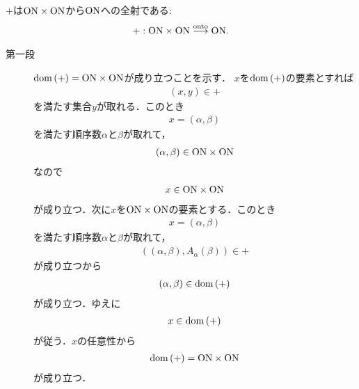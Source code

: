 	\begin{screen}
		\begin{thm}[$+$は$\ON$への全射である]\label{thm:summation_on_ordinal_numbers_is_a_mapping}
			$+$は$\mathrm{ON} \times \mathrm{ON}$から$\ON$への全射である:
			\begin{align}
				+:\mathrm{ON} \times \mathrm{ON} \overset{\mathrm{onto}}{\longrightarrow} \mathrm{ON}.
			\end{align}
		\end{thm}
	\end{screen}
	
	\begin{sketch}\mbox{}
		\begin{description}
			\item[第一段] $\operatorname*{dom} \left(+\right) = \mathrm{ON} \times \mathrm{ON}$が成り立つことを示す．
				$x$を$\operatorname*{dom} \left(+\right)$の要素とすれば
				\begin{align}
					(x,y) \in +
				\end{align}
				を満たす集合$y$が取れる．このとき
				\begin{align}
					x = (\alpha,\beta)
				\end{align}
				を満たす順序数$\alpha$と$\beta$が取れて，
				\begin{align}
					(\alpha, \beta) \in \mathrm{ON} \times \mathrm{ON}
				\end{align}
				なので
				\begin{align}
					x \in \mathrm{ON} \times \mathrm{ON}
				\end{align}
				が成り立つ．次に$x$を$\mathrm{ON} \times \mathrm{ON}$の要素とする．このとき
				\begin{align}
					x = (\alpha,\beta)
				\end{align}
				を満たす順序数$\alpha$と$\beta$が取れて，
				\begin{align}
					((\alpha,\beta),A_\alpha(\beta)) \in +
				\end{align}
				が成り立つから
				\begin{align}
					(\alpha,\beta) \in \operatorname*{dom} \left(+\right)
				\end{align}
				が成り立つ．ゆえに
				\begin{align}
					x \in \operatorname*{dom} \left(+\right)
				\end{align}
				が従う．$x$の任意性から
				\begin{align}
					\operatorname*{dom} \left(+\right) = \mathrm{ON} \times \mathrm{ON}
				\end{align}
				が成り立つ．
				

\end{description}
\end{sketch}
